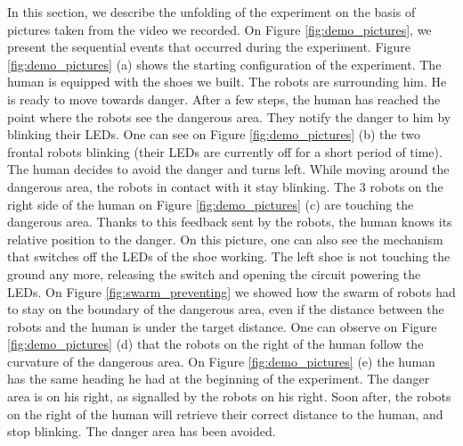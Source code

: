 \documentclass[oneside, a4paper, 12pt]{memoir}
\begin{document}
			In this section, we describe the unfolding of the experiment on the basis of pictures taken from the video we recorded. On Figure \ref{fig:demo_pictures}, we present the sequential events that occurred during the experiment. Figure \ref{fig:demo_pictures} (a) shows the starting configuration of the experiment. The human is equipped with the shoes we built. The robots are surrounding him. He is ready to move towards danger. After a few steps, the human has reached the point where the robots see the dangerous area. They notify the danger to him by blinking their LEDs. One can see on Figure \ref{fig:demo_pictures} (b) the two frontal robots blinking (their LEDs are currently off for a short period of time). The human decides to avoid the danger and turns left. While moving around the dangerous area, the robots in contact with it stay blinking. The 3 robots on the right side of the human on Figure \ref{fig:demo_pictures} (c) are touching the dangerous area. Thanks to this feedback sent by the robots, the human knows its relative position to the danger. On this picture, one can also see the mechanism that switches off the LEDs of the shoe working. The left shoe is not touching the ground any more, releasing the switch and opening the circuit powering the LEDs. On Figure \ref{fig:swarm_preventing} we showed how the swarm of robots had to stay on the boundary of the dangerous area, even if the distance between the robots and the human is under the target distance. One can observe on Figure \ref{fig:demo_pictures} (d) that the robots on the right of the human follow the curvature of the dangerous area. On Figure \ref{fig:demo_pictures} (e) the human has the same heading he had at the beginning of the experiment. The danger area is on his right, as signalled by the robots on his right. Soon after, the robots on the right of the human will retrieve their correct distance to the human, and stop blinking. The danger area has been avoided.
			
\end{document}
